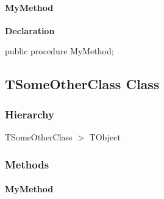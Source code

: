 \documentclass{report}
\newif\ifpdf
\begin{document}
\paragraph*{MyMethod}\hspace*{\fill}

\label{ok_links_2.TSomeClass-MyMethod}
\begin{list}{}{
\setlength{\itemindent}{0cm}
\setlength{\listparindent}{0cm}
\setlength{\leftmargin}{\evensidemargin}
\addtolength{\leftmargin}{\tmplength}
\settowidth{\labelsep}{X}
\addtolength{\leftmargin}{\labelsep}
\setlength{\labelwidth}{\tmplength}
}
\item[\textbf{Declaration}\hfill]
\ifpdf
\begin{flushleft}
\fi
\begin{ttfamily}
public procedure MyMethod;\end{ttfamily}

\ifpdf
\end{flushleft}
\fi

\end{list}
\ifpdf
\subsection*{\large{\textbf{TSomeOtherClass Class}}\normalsize\hspace{1ex}\hrulefill}
\else
\subsection*{TSomeOtherClass Class}
\fi
\label{ok_links_2.TSomeOtherClass}
\subsubsection*{\large{\textbf{Hierarchy}}\normalsize\hspace{1ex}\hfill}
TSomeOtherClass {$>$} TObject
\subsubsection*{\large{\textbf{Methods}}\normalsize\hspace{1ex}\hfill}
\paragraph*{MyMethod}\hspace*{\fill}
\end{document}
